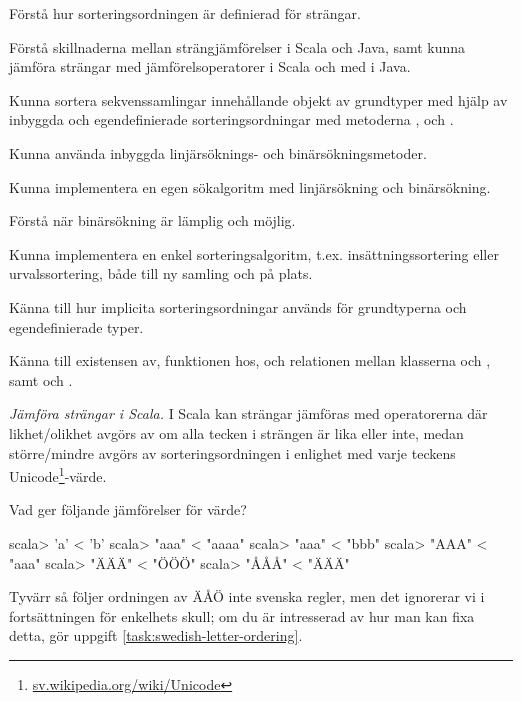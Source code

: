 

\Exercise{\ExeWeekTEN}\label{exe:W10}

\begin{Goals}
\item Förstå hur sorteringsordningen är definierad för strängar.
\item Förstå skillnaderna mellan strängjämförelser i Scala och Java, samt kunna jämföra strängar med jämförelsoperatorer i Scala och med  i Java.
\item Kunna sortera sekvenssamlingar innehållande objekt av grundtyper med hjälp av inbyggda och egendefinierade sorteringsordningar med metoderna ,  och .
\item Kunna använda inbyggda linjärsöknings- och binärsökningsmetoder. 
\item Kunna implementera en egen sökalgoritm med linjärsökning och binärsökning.
\item Förstå när binärsökning är lämplig och möjlig.
\item Kunna implementera en enkel sorteringsalgoritm, t.ex. insättningssortering eller urvalssortering, både till ny samling och på plats.   
\item Känna till hur implicita sorteringsordningar används för grundtyperna och egendefinierade typer.
\item Känna till existensen av, funktionen hos, och relationen mellan klasserna  och , samt   och .
\end{Goals}

\begin{Preparations}
\item {} 
\end{Preparations}

\BasicTasks %

\Task \label{task:string-order-operators}\emph{Jämföra strängar i Scala.} I Scala kan strängar jämföras med operatorerna \code{== != < <= > >= }  där likhet/olikhet avgörs av om alla tecken i strängen är lika eller inte, medan större/mindre avgörs av sorteringsordningen i enlighet med varje teckens Unicode\footnote{\href{https://sv.wikipedia.org/wiki/Unicode}{sv.wikipedia.org/wiki/Unicode}}-värde. 

\Subtask Vad ger följande jämförelser för värde?
\begin{REPL}
scala> 'a' < 'b'
scala> "aaa" < "aaaa"
scala> "aaa" < "bbb"
scala> "AAA" < "aaa"
scala> "ÄÄÄ" < "ÖÖÖ"
scala> "ÅÅÅ" < "ÄÄÄ"
\end{REPL}
Tyvärr så följer ordningen av ÄÅÖ inte svenska regler, men det ignorerar vi i fortsättningen för enkelhets skull; om du är intresserad av hur man kan fixa  detta, gör uppgift \ref{task:swedish-letter-ordering}. 

